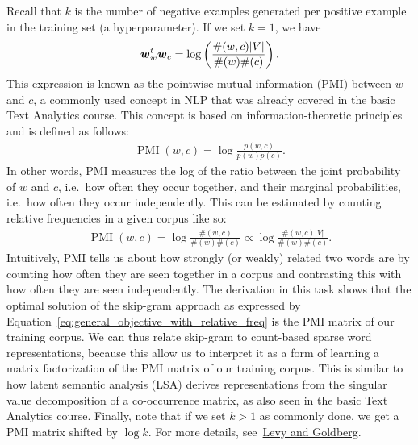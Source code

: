 \documentclass[11pt,a4paper]{article}
\begin{document}
\begin{enumerate}[label=(\alph*)]
          Recall that $k$ is the number of negative examples generated per
          positive example in the training set (a hyperparameter).
          If we set $k = 1$, we have
          \begin{align*}
              {\boldsymbol{w}}_{w}^t{\boldsymbol{w}}_{c} & = \log\left(\frac{\#(w,c)|V|}{\#(w)\#(c)}\right). \\
          \end{align*}
          This expression is known as the pointwise mutual information (PMI)
          between $w$ and $c$, a commonly used concept in NLP that was already
          covered in the basic Text Analytics course.
          This concept is based on information-theoretic principles and is
          defined as follows:
          \begin{align*}
              \operatorname{PMI}(w,c) = \log\frac{p(w,c)}{p(w)p(c)}.
          \end{align*}
          In other words, PMI measures the log of the ratio between the joint
          probability of $w$ and $c$, i.e.\ how often they occur together, and
          their marginal probabilities, i.e.\ how often they occur
          independently.
          This can be estimated by counting relative frequencies in a given
          corpus like so:
          \begin{align*}
              \operatorname{PMI}(w,c) = \log\frac{\#(w,c)}{\#(w)\#(c)}\propto\log\frac{\#(w,c)|V|}{\#(w)\#(c)}.
          \end{align*}
          Intuitively, PMI tells us about how strongly (or weakly) related two
          words are by counting how often they are seen together in a corpus and
          contrasting this with how often they are seen independently.
          The derivation in this task shows that the optimal solution of the
          skip-gram approach as expressed by
          Equation~\ref{eq:general_objective_with_relative_freq} is the PMI
          matrix of our training corpus.
          We can thus relate skip-gram to count-based sparse word
          representations, because this allow us to interpret it as a form of
          learning a matrix factorization of the PMI matrix of our training
          corpus.
          This is similar to how latent semantic analysis (LSA) derives
          representations from the singular value decomposition of a
          co-occurrence matrix, as also seen in the basic Text Analytics course.
          Finally, note that if we set $k > 1$ as commonly done, we get a PMI
          matrix shifted by $\log k$.
          For more details,
          see~\href{https://papers.nips.cc/paper_files/paper/2014/file/feab05aa91085b7a8012516bc3533958-Paper.pdf}{Levy and Goldberg}.
\end{enumerate}
\end{document}
